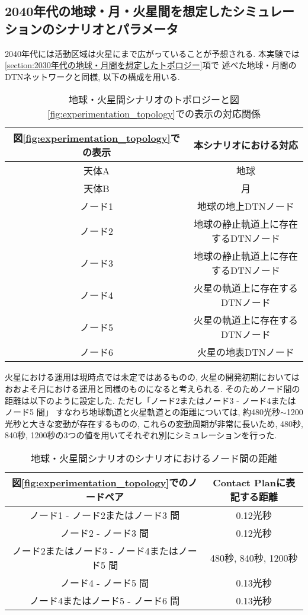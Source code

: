 \subsection{2040年代の地球・月・火星間を想定したシミュレーションのシナリオとパラメータ}
\label{section:2040年代の地球・月・火星間を想定したシミュレーションのシナリオとパラメータ}
2040年代には活動区域は火星にまで広がっていることが予想される. 
本実験では\ref{section:2030年代の地球・月間を想定したトポロジー}項で
述べた地球・月間のDTNネットワークと同様, 以下の構成を用いる. 

\begin{table}[htbp]
    \centering
    \begin{tabular}{c|c}  \hline
        図\ref{fig:experimentation_topology}での表示 & 本シナリオにおける対応 \\ \hline\hline
        天体A & 地球 \\
        天体B & 月 \\
        ノード1 & 地球の地上DTNノード \\
        ノード2 & 地球の静止軌道上に存在するDTNノード \\
        ノード3 & 地球の静止軌道上に存在するDTNノード \\
        ノード4 & 火星の軌道上に存在するDTNノード \\
        ノード5 & 火星の軌道上に存在するDTNノード \\
        ノード6 & 火星の地表DTNノード \\ \hline
    \end{tabular}
    \caption{地球・火星間シナリオのトポロジーと図\ref{fig:experimentation_topology}での表示の対応関係}
    \label{table:earth_mars_scenario_topology}
\end{table}

火星における運用は現時点では未定ではあるものの, 
火星の開発初期においてはおおよそ月における運用と同様のものになると考えられる. 
そのためノード間の距離は以下のように設定した. ただし「ノード2またはノード3 - ノード4またはノード5  間」
すなわち地球軌道と火星軌道との距離については, 約480光秒$\sim$1200光秒と大きな変動が存在するものの, 
これらの変動周期が非常に長いため, 480秒, 840秒, 1200秒の3つの値を用いてそれぞれ別にシミュレーションを行った.

\begin{table}[htbp]
    \centering
    \begin{tabular}{c|c}  \hline
        図\ref{fig:experimentation_topology}でのノードペア & Contact Planに表記する距離 \\ \hline\hline
        ノード1 - ノード2またはノード3 間　& 0.12光秒 \\
        ノード2 - ノード3 間 & 0.12光秒 \\
        ノード2またはノード3 - ノード4またはノード5  間 & 480秒, 840秒, 1200秒 \\
        ノード4 - ノード5  間 & 0.13光秒 \\
        ノード4またはノード5 - ノード6  間 & 0.13光秒 \\ \hline
    \end{tabular}
    \caption{地球・火星間シナリオのシナリオにおけるノード間の距離}
    \label{table:earth_mars_scenario_distance}
\end{table}

